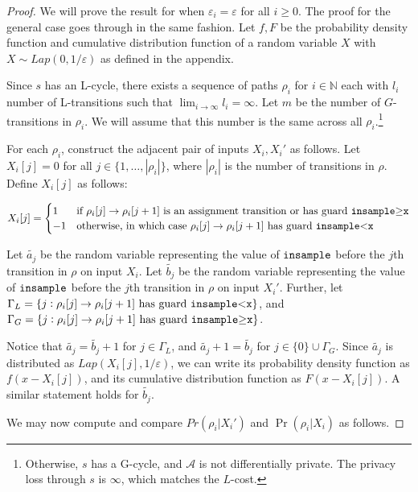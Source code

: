 \documentclass{article}
\newcommand{\N}{\mathbb{N}}
\renewcommand{\epsilon}{\varepsilon}
\newcommand{\insamplegeqx}{\textup{\texttt{insample$\geq$x}}}
\newcommand{\insampleltx}{\textup{\texttt{insample$<$x}}}
\newcommand{\insample}{\textup{\texttt{insample}}}
\newcommand{\1}{\langle 1 \rangle}
\newcommand{\2}{\langle 2 \rangle}
\begin{document}
\begin{proof}
    We will prove the result for when $\epsilon_i = \epsilon$ for all $i \geq 0$. The proof for the general case goes through in the same fashion. Let $f, F$ be the probability density function and cumulative distribution function of a random variable $X$ with $X \sim Lap(0, 1/\epsilon)$ as defined in the appendix. 

    Since $s$ has an L-cycle, there exists a sequence of paths $\rho_i$ for $i \in \N$ each with $l_i$ number of L-transitions such that $\lim_{i \to \infty} l_i = \infty$. Let $m$ be the number of $G$-transitions in $\rho_i$. We will assume that this number is the same across all $\rho_i$.\footnote{Otherwise, $s$ has a G-cycle, and $\mathcal{A}$ is not differentially private. The privacy loss through $s$ is $\infty$, which matches the $L$-cost.}
    
    For each $\rho_i$, construct the adjacent pair of inputs $X_i, X_i'$ as follows. Let $X_i[j] = 0$ for all $j \in \{1, \dots, |\rho_i|\}$, where $|\rho_i|$ is the number of transitions in $\rho$. Define $X_i[j]$ as follows:

    \[X_i[j] = \begin{cases}
        1 & \text{if } \rho_i[j] \to \rho_i[j + 1] \text{ is an assignment transition or has guard \insamplegeqx} \\
        -1 & \text{otherwise, in which case } \rho_i[j] \to \rho_i[j + 1] \text{ has guard \insampleltx}\\
    \end{cases}\]

    Let $\tilde{a_j}$ be the random variable representing the value of $\insample$ before the $j$th transition in $\rho$ on input $X_i$. Let $\tilde{b_j}$ be the random variable representing the value of $\insample$ before the $j$th transition in $\rho$ on input $X_i'$. Further, let $\Gamma_L = \{j : \rho_i[j] \to \rho_i[j + 1] \text{ has guard } \insampleltx\}$, and $\Gamma_G = \{j : \rho_i[j] \to \rho_i[j + 1] \text{ has guard } \insamplegeqx\}$. 
    
    Notice that $\tilde{a_j} = \tilde{b_j} + 1$ for $j \in \Gamma_L$, and $\tilde{a_j} + 1 = \tilde{b_j}$ for $j \in \{0\} \cup \Gamma_G$. Since $\tilde{a_j}$ is distributed as $Lap(X_i[j], 1/\epsilon)$, we can write its probability density function as $f(x - X_i[j])$, and its cumulative distribution function as $F(x - X_i[j])$. A similar statement holds for $\tilde{b_j}$.
    
    We may now compute and compare $Pr(\rho_i | X_i')$ and $\Pr(\rho_i | X_i)$ as follows.


\end{proof}
\end{document}
